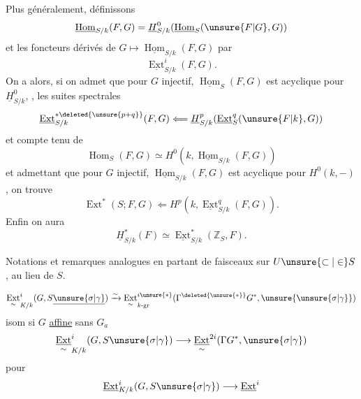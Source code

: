 Plus généralement, définissons
\[
\underline{\operatorname{Hom}}_{S/k}(F,G)=
\underline H^0_{S/k}(\underline{\operatorname{Hom}}_S(\unsure{F|G},G))
\]
 et  les foncteurs dérivés de
$G\longmapsto\underline{\operatorname{Hom}}_{S/k}(F,G)$ par
\[
\underline{\operatorname{Ext}}^i_{S/k}(F,G).
\]
On a alors, si on admet que pour $G$ injectif,
$\underline{\operatorname{Hom}}_S(F,G)$ est acyclique pour
$\underline H^0_{S/k}$, , les suites spectrales
\[
\underline{\operatorname{Ext}}^{*\deleted{\unsure{p+q}}}_{S/k}(F,G)
\Longleftarrow\underline H^p_{S/k}
(\underline{\operatorname{Ext}}^q_S(\unsure{F|k},G))
\]
et compte tenu de
\[
\operatorname{Hom}_S(F,G)\simeq
H^0(k,\underline{\operatorname{Hom}}_{S/k}(F,G))
\]
et admettant que pour $G$ injectif,
$\underline{\operatorname{Hom}}_{S/k}(F,G)$ est acyclique pour $H^0(k,-)$,
on trouve
\[
\operatorname{Ext}^*(S;F,G)\Longleftarrow
H^p(k,\underline{\operatorname{Ext}}^q_{S/k}(F,G)).
\]
Enfin on aura
\[
\underline H^*_{S/k}(F)\simeq
\underline{\operatorname{Ext}}^*_{S/k}(\mathbb Z_S,F).
\]

Notations et remarques analogues en partant de faisceaux sur
$U\unsure{\subset|\in}S$, au lieu de $S$.

\[
\underset{\sim}{\operatorname{Ext}}^i_{K/k}(G,S\underline\unsure{\sigma|\gamma})
\xrightarrow{\sim}
\underset{\sim}{\operatorname{Ext}}^{i\unsure{*}}_{k\text{-gr}}
(\Gamma^{\deleted{\unsure{*}}}G^*,\unsure{\unsure{\sigma|\gamma}})
\]
isom si $G$ \uline{affine} sans  $G_a$
\[
\underset{\sim}{\underline{\operatorname{Ext}}}^{i}_{K/k}(G,S\unsure{\sigma|\gamma})
\longrightarrow
\underset{\sim}{\underline{\operatorname{Ext}}}^{2i}(\Gamma G^*,\unsure{\sigma|\gamma})
\]
pour
\[
\underline{\operatorname{Ext}}^i_{K/k}(G,S\unsure{\sigma|\gamma})
\longrightarrow \underline{\operatorname{Ext}}^i
\]

